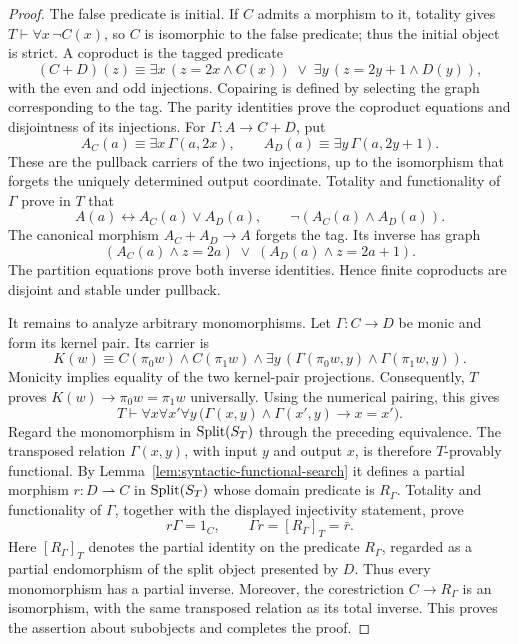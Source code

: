 \begin{proof}
The false predicate is initial. If $C$ admits a morphism to it,
totality gives $T\vdash\forall x\,\neg C(x)$, so $C$ is
isomorphic to the false predicate; thus the initial object is
strict. A coproduct is the tagged predicate
\[
 (C+D)(z)\equiv
   \exists x\,(z=2x\land C(x))\;\lor\;
   \exists y\,(z=2y+1\land D(y)),
\]
with the even and odd injections. Copairing is defined by selecting
the graph corresponding to the tag. The parity identities prove
the coproduct equations and disjointness of its injections.
For $\Gamma:A\to C+D$, put
\[
 A_C(a)\equiv\exists x\,\Gamma(a,2x),\qquad
 A_D(a)\equiv\exists y\,\Gamma(a,2y+1).
\]
These are the pullback carriers of the two injections, up to the
isomorphism that forgets the uniquely determined output coordinate.
Totality and functionality of $\Gamma$ prove in $T$ that
\[
 A(a)\longleftrightarrow A_C(a)\lor A_D(a),\qquad
 \neg(A_C(a)\land A_D(a)).
\]
The canonical morphism $A_C+A_D\to A$ forgets the tag.
Its inverse has graph
\[
 (A_C(a)\land z=2a)\;\lor\;(A_D(a)\land z=2a+1).
\]
The partition equations prove both inverse identities. Hence finite
coproducts are disjoint and stable under pullback.

It remains to analyze arbitrary monomorphisms. Let
$\Gamma:C\to D$ be monic and form its kernel pair. Its carrier is
\[
 K(w)\equiv C(\pi_0w)\land C(\pi_1w)\land
    \exists y\,(\Gamma(\pi_0w,y)\land\Gamma(\pi_1w,y)).
\]
Monicity implies equality of the two kernel-pair projections.
Consequently, $T$ proves $K(w)\to\pi_0w=\pi_1w$ universally.
Using the numerical pairing, this gives
\[
 T\vdash\forall x\forall x'\forall y\,
  \bigl(\Gamma(x,y)\land\Gamma(x',y)\longrightarrow x=x'\bigr).
\]
Regard the monomorphism in $\operatorname{Split}(S_T)$ through the preceding
equivalence. The transposed relation $\Gamma(x,y)$, with input $y$ and
output $x$, is therefore $T$-provably functional. By
Lemma~\ref{lem:syntactic-functional-search} it defines a partial
morphism $r:D\rightharpoonup C$ in $\operatorname{Split}(S_T)$ whose domain
predicate is $R_\Gamma$. Totality and functionality of $\Gamma$,
together with the displayed injectivity statement, prove
\[
 r\Gamma=1_C,\qquad
 \Gamma r=[R_\Gamma]_T=\bar r.
\]
Here $[R_\Gamma]_T$ denotes the partial identity on the predicate
$R_\Gamma$, regarded as a partial endomorphism of the split object
presented by $D$. Thus every monomorphism has a partial inverse.
Moreover, the corestriction $C\to R_\Gamma$ is an isomorphism,
with the same transposed relation as its total inverse. This proves
the assertion about subobjects and completes the proof.
\end{proof}

